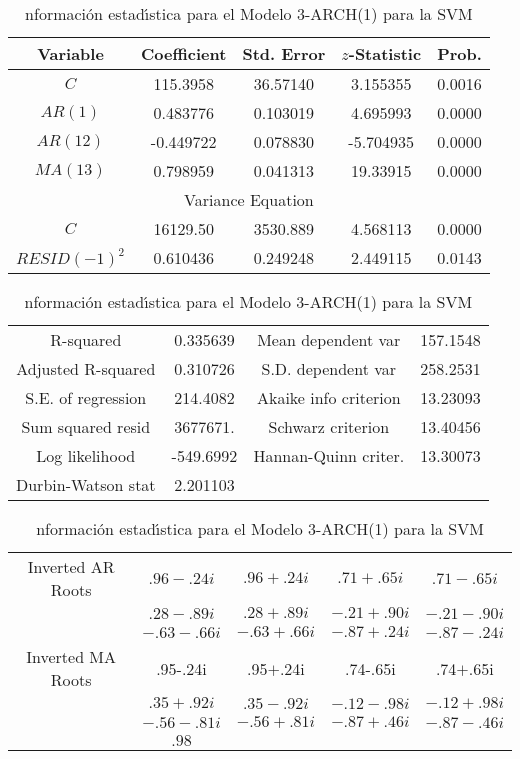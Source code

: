 \begin{table}[H]
\centering\small
\caption{nformaci\'{o}n estad\'{\i}stica para el Modelo 3-ARCH(1) para la 
SVM}
\begin{tabular}{@{}ccccc@{}}
\toprule
Variable& Coefficient& Std. Error& $z$-Statistic& Prob. \\
\midrule
$C$& 115.3958& 36.57140& 3.155355& 0.0016 \\
$AR(1)$& 0.483776& 0.103019& 4.695993& 0.0000 \\
$AR(12)$& -0.449722& 0.078830& -5.704935& 0.0000 \\
$MA(13)$& 0.798959& 0.041313& 19.33915& 0.0000 \\
\midrule
\multicolumn{5}{c}{Variance Equation}\\
\midrule
$C$& 16129.50& 3530.889& 4.568113& 0.0000 \\
$RESID(-1)^2$& 0.610436& 0.249248& 2.449115& 0.0143 \\
\bottomrule
\end{tabular}

\begin{tabular}{@{}cccc@{}}
\toprule
R-squared& 0.335639& Mean dependent var & 157.1548 \\
Adjusted R-squared& 0.310726& S.D. dependent var& 258.2531 \\
S.E. of regression& 214.4082& Akaike info criterion & 13.23093 \\
Sum squared resid& 3677671.& Schwarz criterion & 13.40456 \\
Log likelihood& -549.6992& Hannan-Quinn criter. & 13.30073 \\
Durbin-Watson stat& 2.201103& \\
\bottomrule
\end{tabular}

\begin{tabular}{@{}ccccc@{}}
\toprule
Inverted AR Roots& $.96-.24i$& $.96+.24i$& $.71+.65i$& $.71-.65i$ \\
& $.28-.89i$& $.28+.89i$& $-.21+.90i$& $-.21-.90i$ \\
& $-.63-.66i$& $-.63+.66i$& $-.87+.24i$& $-.87-.24i$ \\
Inverted MA Roots& .95-.24i& .95$+$.24i& .74-.65i& .74$+$.65i \\
& $.35+.92i$& $.35-.92i$& $-.12-.98i$& $-.12+.98i$ \\
& $-.56-.81i$& $-.56+.81i$& $-.87+.46i$& $-.87-.46i$ \\
& $.98$ & &  \\
\bottomrule
\end{tabular}
\end{table}



